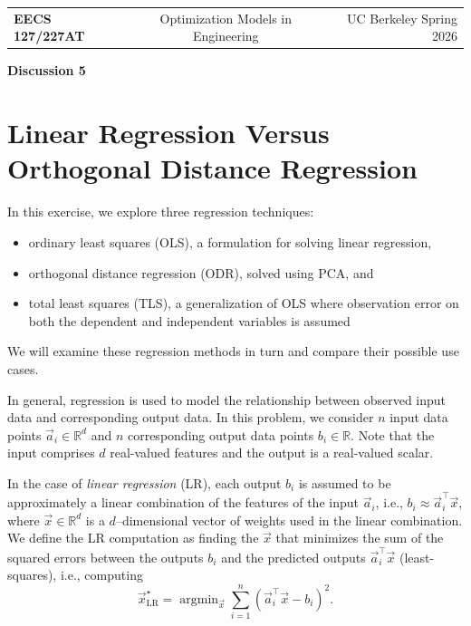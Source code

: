 \documentclass[10pt]{article}
\newcommand{\RR}{\mathbb{R}}
\DeclareMathOperator*{\argmin}{argmin}
\begin{document}
\begin{center}
\begin{tabular}{lcr}
\textbf{EECS 127/227AT} & Optimization Models in Engineering & UC Berkeley \quad Spring 2026
\end{tabular}
\end{center}

\begin{center}
{\LARGE \textbf{Discussion 5}}
\end{center}

\section{Linear Regression Versus Orthogonal Distance Regression}

In this exercise, we explore three regression techniques:
\begin{itemize}
\item ordinary least squares (OLS), a formulation for solving linear regression,
\item orthogonal distance regression (ODR), solved using PCA, and
\item total least squares (TLS), a generalization of OLS where observation error on both the dependent and independent variables is assumed
\end{itemize}

We will examine these regression methods in turn and compare their possible use cases.

In general, regression is used to model the relationship between observed input data and corresponding output data. In this problem, we consider $n$ input data points $\vec{a}_i \in \RR^d$ and $n$ corresponding output data points $b_i \in \RR$. Note that the input comprises $d$ real-valued features and the output is a real-valued scalar.

In the case of \textit{linear regression} (LR), each output $b_i$ is assumed to be approximately a linear combination of the features of the input $\vec{a}_i$, i.e., $b_i \approx \vec{a}_i^\top \vec{x}$, where $\vec{x} \in \RR^d$ is a $d$--dimensional vector of weights used in the linear combination. We define the LR computation as finding the $\vec{x}$ that minimizes the sum of the squared errors between the outputs $b_i$ and the predicted outputs $\vec{a}_i^\top \vec{x}$ (least-squares), i.e., computing
\begin{equation}
\vec{x}^\star_{\text{LR}} = \argmin_{\vec{x}} \sum_{i=1}^{n} (\vec{a}_i^\top \vec{x} - b_i)^2.
\end{equation}
\end{document}
